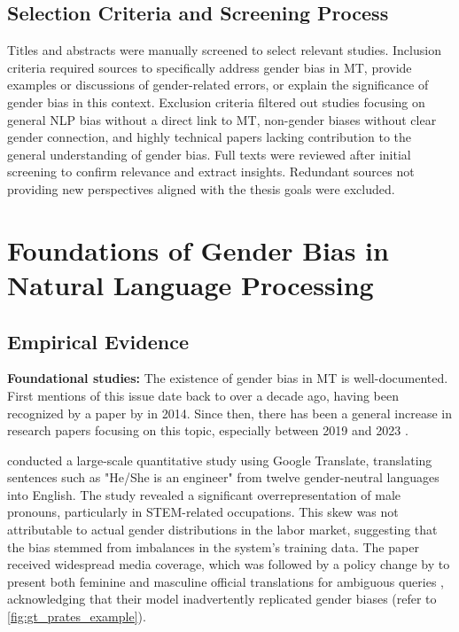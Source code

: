 \subsection{Selection Criteria and Screening Process}
Titles and abstracts were manually screened to select relevant studies. Inclusion criteria required sources to specifically address gender bias in MT, provide examples or discussions of gender-related errors, or explain the significance of gender bias in this context. Exclusion criteria filtered out studies focusing on general NLP bias without a direct link to MT, non-gender biases without clear gender connection, and highly technical papers lacking contribution to the general understanding of gender bias. Full texts were reviewed after initial screening to confirm relevance and extract insights. Redundant sources not providing new perspectives aligned with the thesis goals were excluded.

\section{Foundations of Gender Bias in Natural Language Processing}
\subsection{Empirical Evidence}

\noindent \textbf{Foundational studies:} The existence of gender bias in MT is well-documented. First mentions of this issue date back to over a decade ago, having been recognized by a paper by \citeauthor{schiebingerScientificResearchMust2014} in 2014. Since then, there has been a general increase in research papers focusing on this topic, especially between 2019 and 2023 \citep{savoldiDecadeGenderBias2025}.

\citet{pratesAssessingGenderBias2019} conducted a large-scale quantitative study using Google Translate, translating sentences such as "He/She is an engineer" from twelve gender-neutral languages into English. The study revealed a significant overrepresentation of male pronouns, particularly in STEM-related occupations. This skew was not attributable to actual gender distributions in the labor market, suggesting that the bias stemmed from imbalances in the system’s training data. The paper received widespread media coverage, which was followed by a policy change by \citeauthor{googleReducingGenderBias2018} to present both feminine and masculine official translations for ambiguous queries \citep{googleReducingGenderBias2018}, acknowledging that their model inadvertently replicated gender biases (refer to \autoref{fig:gt_prates_example}). 


